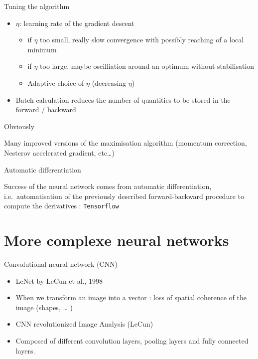 \documentclass[ignorenonframetext,]{beamer}
\providecommand{\tightlist}{%
  \setlength{\itemsep}{0pt}\setlength{\parskip}{0pt}}
\begin{document}
\begin{frame}{Tuning the algorithm}
\protect\hypertarget{tuning-the-algorithm}{}

\begin{itemize}
\tightlist
\item
  \(\eta\): learning rate of the gradient descent

  \begin{itemize}
  \tightlist
  \item
    if \(\eta\) too small, really slow convergence with possibly
    reaching of a local minimum\\
  \item
    if \(\eta\) too large, maybe oscilliation around an optimum without
    stabilisation
  \item
    Adaptive choice of \(\eta\) (decreasing \(\eta\))
  \end{itemize}
\item
  Batch calculation reduces the number of quantities to be stored in the
  forward / backward
\end{itemize}

\end{frame}

\begin{frame}{Obviously}
\protect\hypertarget{obviously}{}

Many improved versions of the maximisation algorithm (momentum
correction, Nesterov accelerated gradient, etc\ldots{})

\end{frame}

\begin{frame}[fragile]{Automatic differentiation}
\protect\hypertarget{automatic-differentiation}{}

Success of the neural network comes from automatic differentiation,
i.e.~automatisation of the previously described forward-backward
procedure to compute the derivatives : \texttt{Tensorflow}

\end{frame}

\hypertarget{more-complexe-neural-networks}{%
\section{More complexe neural
networks}\label{more-complexe-neural-networks}}

\begin{frame}{Convolutional neural network (CNN)}
\protect\hypertarget{convolutional-neural-network-cnn}{}

\begin{itemize}
\item
  LeNet by LeCun et al., 1998
\item
  When we transform an image into a vector : loss of spatial coherence
  of the image (shapes, \ldots{} )
\item
  CNN revolutionized Image Analysis (LeCun)
\item
  Composed of different convolution layers, pooling layers and fully
  connected layers.
\end{itemize}

\end{frame}
\end{document}
